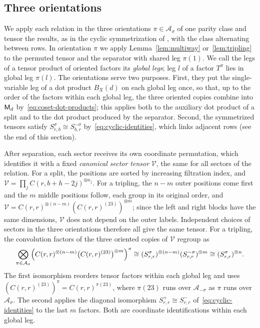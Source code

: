 \subsection{Three orientations}
\label{subsec:orientations}

We apply each relation in the three orientations
\(\pi\in\mathcal A_\sigma\) of one parity class and tensor the results, as
in the cyclic symmetrization of \citet[Section~3.2]{CVZ21}, with the class
alternating between rows. In orientation \(\pi\) we apply
Lemma~\ref{lem:multiway} or~\ref{lem:tripling} to the permuted tensor and
the separator with shared leg \(\pi(1)\). We call the legs of a tensor
product of oriented factors its \emph{global legs}; leg \(l\) of a factor
\(T^\pi\) lies in global leg \(\pi(l)\). The orientations serve two
purposes. First, they put the single-variable leg of a dot product
\(B_X(d)\) on each global leg once, so that, up to the order of the
factors within each global leg, the three oriented copies combine into
\(\mathsf M_d\) by~\eqref{eq:coset-dot-products}; this applies both to the
auxiliary dot product of a split and to the dot product produced by the
separator. Second, the symmetrized tensors satisfy
\(S^\sigma_{r,b}\cong S^{-\sigma}_{b,r}\) by~\eqref{eq:cyclic-identities},
which links adjacent rows (see the end of this section).

After separation, each sector receives its own coordinate permutation,
which identifies it with a fixed \emph{canonical sector tensor}
\(\mathcal V\), the same for all sectors of the relation. For a split,
the positions are sorted by increasing filtration index, and
\(\mathcal V=\prod_jC(r,b+h-2j)^{\otimes n_j}\). For a tripling, the
\(n-m\) outer positions come first and the \(m\) middle positions follow,
each group in its original order, and
\(\mathcal V=C(r,r)^{\otimes(n-m)}(C(r,r)^{(23)})^{\otimes m}\); since the
left and right blocks have the same dimensions, \(\mathcal V\) does not
depend on the outer labels. Independent choices of sectors in the three
orientations therefore all give the same tensor. For a tripling, the
convolution factors of the three oriented copies of \(\mathcal V\)
regroup as
\begin{equation}\label{eq:cyclic-tripling-balance}
 \bigotimes_{\pi\in\mathcal A_\sigma}
 \Bigl(C(r,r)^{\otimes(n-m)}\bigl(C(r,r)^{(23)}\bigr)^{\otimes m}\Bigr)^\pi
 \cong(S^\sigma_{r,r})^{\otimes(n-m)}(S^{-\sigma}_{r,r})^{\otimes m}
 \cong(S^\sigma_{r,r})^{\otimes n}.
\end{equation}
The first isomorphism reorders tensor factors within each global leg and
uses \((C(r,r)^{(23)})^\pi=C(r,r)^{\pi(23)}\), where \(\pi(23)\) runs
over \(\mathcal A_{-\sigma}\) as \(\pi\) runs over \(\mathcal A_\sigma\).
The second applies the diagonal isomorphism
\(S^+_{r,r}\cong S^-_{r,r}\) of~\eqref{eq:cyclic-identities} to the last
\(m\) factors. Both are coordinate identifications within each global
leg.

